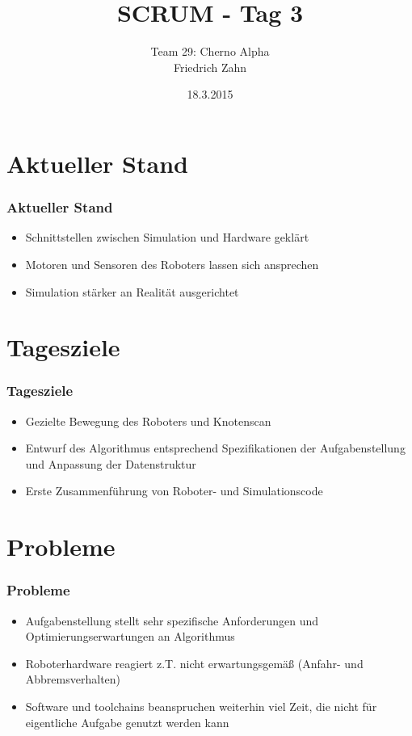 \documentclass[ddcfooter,nototalpage]{tudbeamer}
\begin{document}
\title{SCRUM - Tag 3}
\author{Team 29: Cherno Alpha \\ Friedrich Zahn}
\date{18.3.2015}
\maketitle

\section{Aktueller Stand}
\begin{frame}
\frametitle{Aktueller Stand}
\begin{itemize}
  \item Schnittstellen zwischen Simulation und Hardware geklärt
  \item Motoren und Sensoren des Roboters lassen sich ansprechen
  \item Simulation stärker an Realität ausgerichtet
\end{itemize}
\end{frame}

\section{Tagesziele}
\begin{frame}
\frametitle{Tagesziele}
\begin{itemize}
  \item Gezielte Bewegung des Roboters und Knotenscan
  \item Entwurf des Algorithmus entsprechend Spezifikationen der Aufgabenstellung und Anpassung der Datenstruktur
  \item Erste Zusammenführung von Roboter- und Simulationscode
\end{itemize}
\end{frame}

\section{Probleme}
\begin{frame}
\frametitle{Probleme}
\begin{itemize}
  \item Aufgabenstellung stellt sehr spezifische Anforderungen und Optimierungserwartungen an Algorithmus
  \item Roboterhardware reagiert z.T. nicht erwartungsgemäß (Anfahr- und Abbremsverhalten)
  \item Software und toolchains beanspruchen weiterhin viel Zeit, die nicht für eigentliche Aufgabe genutzt werden kann
\end{itemize}
\end{frame}
\end{document}
